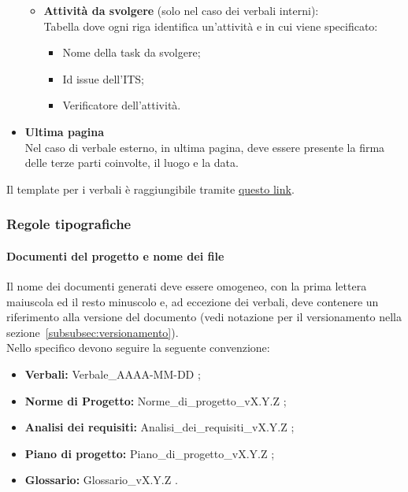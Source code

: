 \begin{itemize}
\begin{itemize}
            \item \textbf{Attività da svolgere} (solo nel caso dei verbali interni): \\
            Tabella dove ogni riga identifica un'attività e in cui viene specificato:
                \begin{itemize}
                    \item Nome della task da svolgere;
                    \item Id issue dell'ITS;
                    \item Verificatore dell'attività.
                \end{itemize}
        \end{itemize}
    \item \textbf{Ultima pagina} \\
        Nel caso di verbale esterno, in ultima pagina, deve essere presente la firma delle terze parti coinvolte, il luogo e la data.
\end{itemize}

Il template per i verbali è raggiungibile tramite \href{https://github.com/ByteOps-swe/Sorgente-documenti/tree/main/Documents/Verbali/Templates}{questo link}.

\subsubsection{Regole tipografiche}
\paragraph*{Documenti del progetto e nome dei file}\label{sec:NomeFile}
Il nome dei documenti generati deve essere omogeneo, con la prima lettera maiuscola ed il resto minuscolo e, ad eccezione dei verbali, deve contenere un riferimento alla versione del documento (vedi notazione per il versionamento nella sezione~\ref{subsubsec:versionamento}). \\
Nello specifico devono seguire la seguente convenzione:
\begin{itemize}
    \item \textbf{Verbali:} Verbale\_AAAA-MM-DD ;
    \item \textbf{Norme di Progetto:} Norme\_di\_progetto\_vX.Y.Z ;
    \item \textbf{Analisi dei requisiti:} Analisi\_dei\_requisiti\_vX.Y.Z ;
    \item \textbf{Piano di progetto:} Piano\_di\_progetto\_vX.Y.Z ;
    \item \textbf{Glossario:} Glossario\_vX.Y.Z .
\end{itemize}

